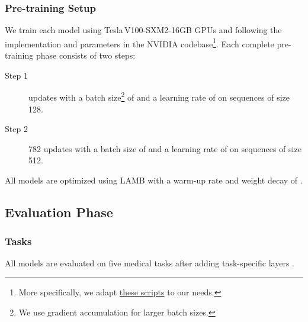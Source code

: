 \documentclass[11pt]{article}
\begin{document}
\subsubsection{Pre-training Setup}\label{sec:pretrainingSetup}

We train each model using  Tesla\,V100-SXM2-16GB GPUs and following the implementation and parameters in the NVIDIA codebase\footnote{More specifically, we adapt \href{https://github.com/NVIDIA/DeepLearningExamples/tree/master/PyTorch/LanguageModeling/BERT}{these scripts} to our needs.}. Each complete pre-training phase consists of two steps:

\begin{description}
    \item[Step 1]  updates with a batch size\footnote{We use gradient accumulation for larger batch sizes.} of  and a learning rate of  on sequences of size 128.
    \item[Step 2] 782 updates with a batch size of  and a learning rate of  on sequences of size 512.
\end{description}

\noindent All models are optimized using LAMB \cite{you2019large} with a warm-up rate and weight decay of .

\subsection{Evaluation Phase}
\subsubsection{Tasks}
All models are evaluated on five medical tasks after adding task-specific layers \cite{devlin-etal-2019-bert}.
\end{document}
